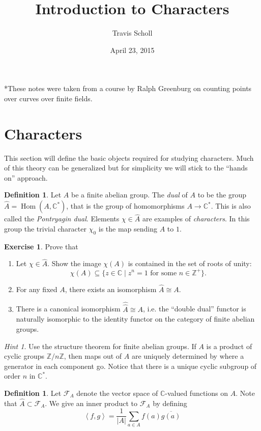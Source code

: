 \documentclass[11pt]{article}
\date{April 23, 2015}
\newcommand{\BB}[1]{\mathbb{#1}} %
\newcommand{\script}[1]{\mathcal{#1}} %
\newcommand{\free}[1]{\left\langle#1\right\rangle} %
\newcommand{\CC}{\BB{C}}
\newcommand{\ZZ}{\BB{Z}}
\newcommand{\sF}{\script{F}}
\newcommand{\st}{\mid}
\newcommand{\Hom}{\operatorname{Hom}}
\renewcommand{\hat}{\widehat}
\theoremstyle{plain}
\theoremstyle{definition}
\newtheorem{defn}[definitioncounter]{Definition}
\newtheorem{excer}[exercisecounter]{Exercise}
\theoremstyle{remark}
\newtheorem*{hint}{Hint}
\newcommand{\mytitle}{Introduction to Characters}
\newcommand{\myauthor}{Travis Scholl}
\begin{document}
\title{\bfseries\sffamily \mytitle}
\author{\sc \myauthor }
\maketitle

*These notes were taken from a course by Ralph Greenburg on counting points over curves over finite fields.

\section{Characters}
\hfill

This section will define the basic objects required for studying characters. Much of this theory can be generalized but for simplicity we will stick to the ``hands on'' approach.

\begin{defn}
	Let $A$ be a finite abelian group. The \emph{dual} of $A$ to be the group $\hat{A} = \Hom(A,\CC^*)$, that is the group of homomorphisms $A \to \CC^*$. This is also called the \emph{Pontryagin dual}. Elements $\chi\in\hat{A}$ are examples of \emph{characters}. In this group the trivial character $\chi_0$ is the map sending $A$ to $1$.
\end{defn}

\begin{excer}\label{ex:charbasics}
	Prove that
	\begin{enumerate}[label=(\alph*)]
		\item Let $\chi\in\hat{A}$. Show the image $\chi(A)$ is contained in the set of roots of unity:
		$$
			\chi(A) \subseteq \{z\in\CC \st z^n=1 \text{ for some $n\in\ZZ^+$}\}.
		$$
		\item For any fixed $A$, there exists an isomorphism $\hat{A} \cong A$.
		\item There is a canonical isomorphism $\hat{\hat{A}} \cong A$, i.e. the ``double dual'' functor is naturally isomorphic to the identity functor on the category of finite abelian groups.
	\end{enumerate}
	\begin{hint}
		Use the structure theorem for finite abelian groups. If $A$ is a product of cyclic groups $\ZZ/n\ZZ$, then maps out of $A$ are uniquely determined by where a generator in each component go. Notice that there is a unique cyclic subgroup of order $n$ in $\CC^*$.
	\end{hint}
\end{excer}

\begin{defn}\label{InnerProduct}
	Let $\sF_A$ denote the vector space of $\CC$-valued functions on $A$. Note that $\hat{A} \subset \sF_A$. We give an inner product to $\sF_A$ by defining
	$$
	\free{f,g} = \frac{1}{|A|}\sum_{a\in A}f(a)\overline{g(a)}
	$$
\end{defn}
\end{document}
